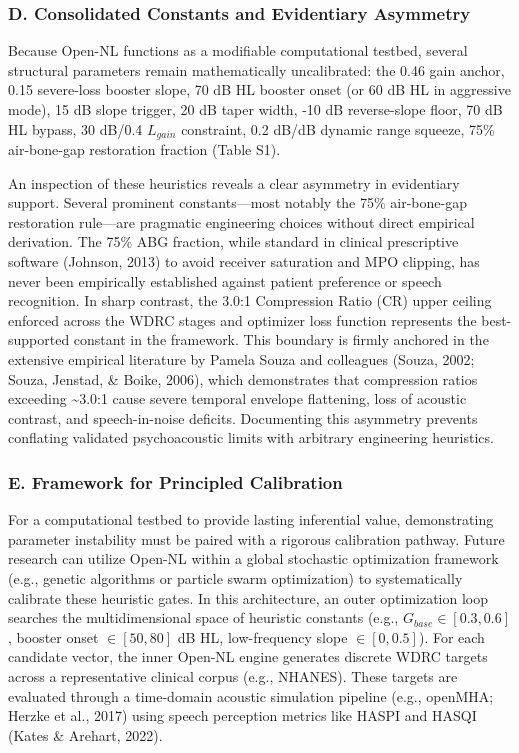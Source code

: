 \documentclass[
  12pt,
]{article}
\begin{document}
\subsubsection{D. Consolidated Constants and Evidentiary
Asymmetry}\label{d.-consolidated-constants-and-evidentiary-asymmetry}

Because Open-NL functions as a modifiable computational testbed, several
structural parameters remain mathematically uncalibrated: the 0.46 gain
anchor, 0.15 severe-loss booster slope, 70 dB HL booster onset (or 60 dB
HL in aggressive mode), 15 dB slope trigger, 20 dB taper width, -10 dB
reverse-slope floor, 70 dB HL bypass, 30 dB/0.4 \(L_{gain}\) constraint,
0.2 dB/dB dynamic range squeeze, 75\% air-bone-gap restoration fraction
(Table S1).

An inspection of these heuristics reveals a clear asymmetry in
evidentiary support. Several prominent constants---most notably the 75\%
air-bone-gap restoration rule---are pragmatic engineering choices
without direct empirical derivation. The 75\% ABG fraction, while
standard in clinical prescriptive software (Johnson, 2013) to avoid
receiver saturation and MPO clipping, has never been empirically
established against patient preference or speech recognition. In sharp
contrast, the 3.0:1 Compression Ratio (CR) upper ceiling enforced across
the WDRC stages and optimizer loss function represents the
best-supported constant in the framework. This boundary is firmly
anchored in the extensive empirical literature by Pamela Souza and
colleagues (Souza, 2002; Souza, Jenstad, \& Boike, 2006), which
demonstrates that compression ratios exceeding \textasciitilde3.0:1
cause severe temporal envelope flattening, loss of acoustic contrast,
and speech-in-noise deficits. Documenting this asymmetry prevents
conflating validated psychoacoustic limits with arbitrary engineering
heuristics.

\subsubsection{E. Framework for Principled
Calibration}\label{e.-framework-for-principled-calibration}

For a computational testbed to provide lasting inferential value,
demonstrating parameter instability must be paired with a rigorous
calibration pathway. Future research can utilize Open-NL within a global
stochastic optimization framework (e.g., genetic algorithms or particle
swarm optimization) to systematically calibrate these heuristic gates.
In this architecture, an outer optimization loop searches the
multidimensional space of heuristic constants (e.g.,
\(G_{base} \in [0.3, 0.6]\), booster onset \(\in [50, 80]\) dB HL,
low-frequency slope \(\in [0, 0.5]\)). For each candidate vector, the
inner Open-NL engine generates discrete WDRC targets across a
representative clinical corpus (e.g., NHANES). These targets are
evaluated through a time-domain acoustic simulation pipeline (e.g.,
openMHA; Herzke et al., 2017) using speech perception metrics like HASPI
and HASQI (Kates \& Arehart, 2022).
\end{document}
